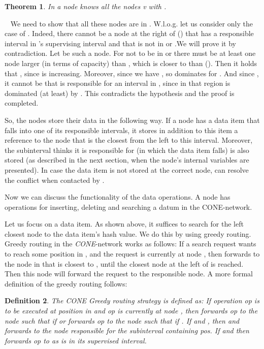 \documentclass[11pt]{article}
\newtheorem{theorem}{Theorem}[section]
\newtheorem{definition}[theorem]{Definition}
\newcommand{\sq}{\hbox{\rlap{}}}
\newcommand{\qed}{\hspace*{\fill}\sq}
\newenvironment{proof}{\noindent {\bf Proof.}\ }{\qed\par\vskip 4mm\par}
\begin{document}
\begin{theorem}\label{theo:responsibility}
In  a node  knows all the nodes v with .
\end{theorem}

\begin{proof}
We need to show that all these nodes  are in  . 
W.l.o.g. let us consider only the case of .
Indeed, there cannot be a node at the right of  () that has a responsible interval in 's supervising interval and that is not in  or .We will prove it by contradiction.
Let  be such a node. For  not to be in  or  there must be at least one node  larger (in terms of capacity) than , which is closer to  than  (). Then  it holds that , since  is increasing. Moreover, since  we have , so  dominates  for . And since , it cannot be that  is responsible for an interval in , since in that region  is dominated (at least) by .
This contradicts the hypothesis and the proof is completed.
\end{proof}

So, the nodes store their data in the following way. If a node  has a data item that falls into one of its responsible intervals, it stores in addition to this item a reference to the node   that is the closest from the left to this interval. Moreover, the subinterval  thinks it is responsible for (in which the data item falls) is also stored (as described in the next section, when the node's internal variables are presented).
 In case the data item is not stored at the correct node,  can resolve the conflict when contacted by .

Now we can discuss the functionality of the data operations.
A node has operations for inserting, deleting and searching a datum in the CONE-network.

Let us focus on  a data item. As shown above, it suffices to search for the left closest node to the data item's hash value.
We do this by using greedy routing. Greedy routing in the \emph{CONE}-network works as follows: If a search request wants to reach some
position  in , and the request is currently at node , then  forwards  to the node  in  that is closest to , until the closest node at the left of  is reached. Then this node will forward the request to the responsible node.
A more formal definition of the greedy routing follows:

\begin{definition}
The CONE Greedy routing strategy is defined as: If operation op is to be executed at position  in  and op is currently at node , then  forwards op to the node  such that  if  or  forwards op to the node  such that  if . If  and , then  and  forwards  to the node responsible for the subinterval containing pos. If  and  then  forwards op to  as  is in its supervised interval.
\end{definition}
\end{document}
